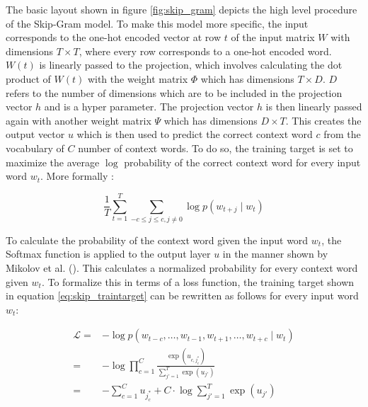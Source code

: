 	\noindent The basic layout shown in figure \ref{fig:skip_gram} depicts the
	high level procedure of the Skip-Gram model. To make this model more
	specific, the input corresponds to the one-hot encoded vector at row $t$ of
	the input matrix $W$ with dimensions $T \times T$, where every row 
	corresponds to a one-hot encoded word. $W(t)$ is linearly passed to the
	projection, which involves calculating the dot product of $W(t)$ with the 
	weight matrix $\Phi$ which has dimensions $T \times D$. $D$ refers to the
	number of dimensions which are to be included in the projection vector $h$ 
	and is a hyper parameter. The projection vector $h$ is then linearly passed
	again with another weight matrix $\Psi$ which has dimensions $D \times T$.
	This creates the output vector $u$ which is then used to predict the correct
	context word $c$ from the vocabulary of $C$ number of context words. To do 
	so, the training target is set to maximize the average $\log$ probability 
	of the correct context word for every input word $w_{t}$. More formally 
	\citep[p. 2]{mikolov2013distributed}:

	\begin{equation}
		\frac{1}{T}\sum_{t=1}^{T}\sum_{-c \leqslant j \leqslant c,j\neq0}\log
		p(w_{t+j}\mid w_{t})
		\label{eq:skip_traintarget}
	\end{equation}

	\noindent To calculate the probability of the context word given the input
	word $w_{t}$, the Softmax function is applied to the output layer $u$ in the 
	manner shown by Mikolov et al. (\citeyear[p. 3]{mikolov2013distributed}). This 
	calculates a normalized probability for every context word given $w_{t}$. To 
	formalize this in terms of a loss function, the training target shown in 
	equation \ref{eq:skip_traintarget} can be rewritten as follows for every
	input word $w_{t}$:

	\begin{equation}
		\begin{split}
		\mathcal{L} =& - \log p(w_{t-c},\dots,w_{t-1},w_{t+1},\dots,w_{t+c}\mid w_{t})\\
			=& - \log \prod_{c=1}^{C}\frac{\exp(u_{c,j_{c}^{*}})}{\sum_{j'=1}^{T}
			\exp(u_{j'})}\\
			=&	- \sum_{c=1}^{C} u_{j_{c}^{*}} + C \cdot \log
								\sum_{j'=1}^{T} \exp(u_{j'})
		\label{eq:deepwalk_loss}
	\end{split}
	\end{equation}

